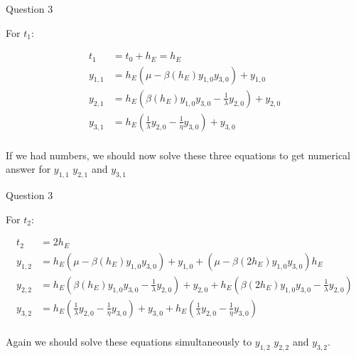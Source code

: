 \documentclass{beamer}
\begin{document}
\begin{frame}{Question 3}


For $t_1$:

\begin{align*}
t_1 &= t_0 + h_E = h_E\\
y_{1,1} &= h_E(\mu - \beta (h_E)y_{1,0}y_{3,0}) + y_{1,0}\\
y_{2,1} &= h_E\left(\beta (h_E)y_{1,0}y_{3,0} - \frac{1}{\lambda}y_{2,0}\right) + y_{2,0}\\
y_{3,1} &= h_E\left(\frac{1}{\lambda}y_{2,0} - \frac{1}{\eta}y_{3,0} \right ) + y_{3,0}\\
\end{align*}

If we had numbers, we should now solve these three equations to get numerical answer for $y_{1,1}$ $y_{2,1}$ and $y_{3,1}$

\end{frame}

\begin{frame}{Question 3}

For $t_2$:

\begin{align*}
t_2 &= 2h_E\\
y_{1,2} &= h_E(\mu - \beta (h_E)y_{1,0}y_{3,0}) + y_{1,0} + (\mu - \beta(2h_E)y_{1,0}y_{3,0})h_E\\
y_{2,2} &= h_E\left(\beta (h_E)y_{1,0}y_{3,0} - \frac{1}{\lambda}y_{2,0}\right) + y_{2,0} + h_E\left(\beta (2h_E)y_{1,0}y_{3,0} - \frac{1}{\lambda}y_{2,0}\right)\\
y_{3,2} &= h_E\left(\frac{1}{\lambda}y_{2,0} - \frac{1}{\eta}y_{3,0} \right ) + y_{3,0} + h_E\left(\frac{1}{\lambda}y_{2,0} - \frac{1}{\eta}y_{3,0} \right )\\
\end{align*}

Again we should solve these equations simultaneously to $y_{1,2}$ $y_{2,2}$ and $y_{3,2}$.


\end{frame}
\end{document}
